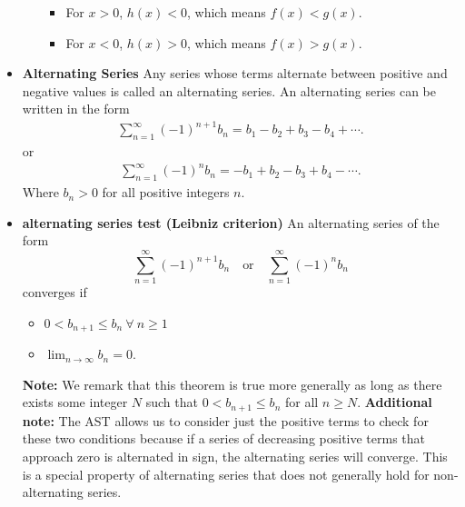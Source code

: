 \documentclass{report}
\begin{document}
\begin{itemize}
\begin{itemize}
            \begin{itemize}
                \item For $x > 0$, $h(x) < 0$, which means $f(x) < g(x)$.
                \item For $x < 0$, $h(x) > 0$, which means $f(x) > g(x)$.
            \end{itemize}
    \end{itemize}

\item \textbf{Alternating Series}
    Any series whose terms alternate between positive and negative values is called an alternating series. An alternating series can be written in the form 
    \begin{align*}
        \sum_{n=1}^{\infty} (-1)^{n+1} b_n = b_1 - b_2 + b_3 - b_4 + \cdots
    .\end{align*}
    or
    \begin{align*}
        \sum_{n=1}^{\infty} (-1)^n b_n = -b_1 + b_2 - b_3 + b_4 - \cdots
    .\end{align*}
    Where  $b_n > 0$  for all positive integers $n$.
\item \textbf{alternating series test (Leibniz criterion)}
    An alternating series of the form
    \[
        \sum_{n=1}^{\infty} (-1)^{n+1} b_n \quad \text{or} \quad \sum_{n=1}^{\infty} (-1)^n b_n
    \]
    converges if
    \begin{itemize}

        \item $0 < b_{n+1} \leq b_n\ \forall\ n \geq 1$
        \item $\lim_{n \to \infty} b_n = 0.$
    \end{itemize}
    \textbf{Note:} We remark that this theorem is true more generally as long as there exists some integer \( N \) such that \( 0 < b_{n+1} \leq b_n \) for all \( n \geq N \).
    \bigbreak \noindent 
    \textbf{Additional note:} The AST allows us to consider just the positive terms to check for these two conditions because if a series of decreasing positive terms that approach zero is alternated in sign, the alternating series will converge. This is a special property of alternating series that does not generally hold for non-alternating series.


\end{itemize}
\end{document}
